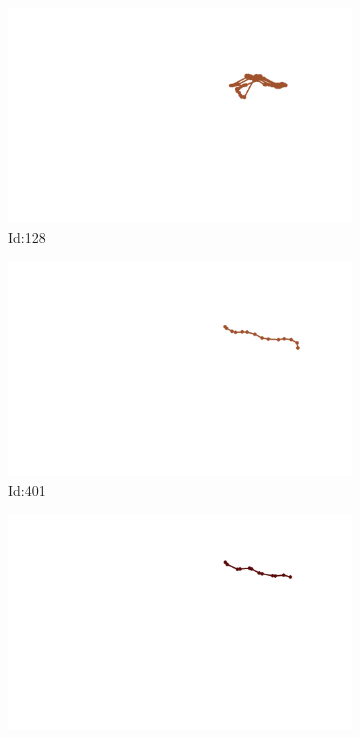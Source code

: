 \documentclass[12pt,twoside]{report}
\begin{document}
\begin{figure}
\centering
\begin{subfigure}[b]{0.20\textwidth}
\centering
\includegraphics[width=\textwidth]{../../trajectories/128.png}
\caption{Id:128}
\end{subfigure}
\begin{subfigure}[b]{0.20\textwidth}
\centering
\includegraphics[width=\textwidth]{../../trajectories/401.png}
\caption{Id:401}
\end{subfigure}
\begin{subfigure}[b]{0.20\textwidth}
\centering
\includegraphics[width=\textwidth]{../../trajectories/404.png}

\end{subfigure}
\end{figure}
\end{document}
